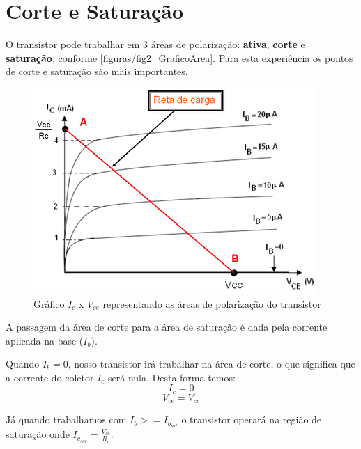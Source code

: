 \section{Corte e Saturação}

	O transistor pode trabalhar em 3 áreas de polarização: \textbf{ativa}, \textbf{corte} e \textbf{saturação}, conforme \autoref{figuras/fig2_GraficoArea}.
	Para esta experiência os pontos de corte e saturação são mais importantes. 
\begin{figure}[htb]
  \caption{\label{figuras/fig2_GraficoArea}Gráfico $I_c$ x $V_{ce}$ representando as áreas de polarização do transistor}
  \includegraphics[scale=0.60]{figuras/fig2_GraficoArea}
  \centering
\end{figure}


A passagem da área de corte para a área de saturação é dada pela corrente aplicada na base ($I_b$). 

Quando $I_b = 0$, nosso transistor irá trabalhar na área de corte, o que significa que a corrente do coletor $I_c$ será nula. Desta forma temos: 
$$I_c = 0$$$$V_{ce} = V_{cc}$$

Já quando trabalhamos com $I_b >= I_{b_{sat}}$ o transistor operará na região de saturação onde $I_{c_{sat}} = \frac{V_{cc}}{R_c}$.
						

